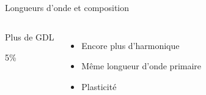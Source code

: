 \documentclass{beamer}
\begin{document}
\begin{frame}{Longueurs d'onde et composition}
\begin{columns}[T]
\begin{block}{Plus de GDL}
5\%
\end{block}
\begin{itemize}
\item Encore plus d'harmonique
\item Même longueur d'onde primaire
\item Plasticité
\end{itemize}
\end{columns}
\end{frame}
\end{document}
